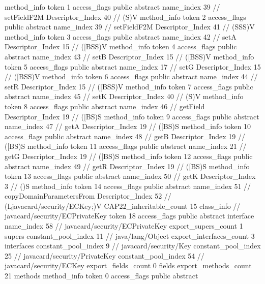 {{{{{				}
				method_info {
					token	1
					access_flags	public abstract
					name_index	39		// setFieldF2M
					Descriptor_Index	40		// (S)V
				}
				method_info {
					token	2
					access_flags	public abstract
					name_index	39		// setFieldF2M
					Descriptor_Index	41		// (SSS)V
				}
				method_info {
					token	3
					access_flags	public abstract
					name_index	42		// setA
					Descriptor_Index	15		// ([BSS)V
				}
				method_info {
					token	4
					access_flags	public abstract
					name_index	43		// setB
					Descriptor_Index	15		// ([BSS)V
				}
				method_info {
					token	5
					access_flags	public abstract
					name_index	17		// setG
					Descriptor_Index	15		// ([BSS)V
				}
				method_info {
					token	6
					access_flags	public abstract
					name_index	44		// setR
					Descriptor_Index	15		// ([BSS)V
				}
				method_info {
					token	7
					access_flags	public abstract
					name_index	45		// setK
					Descriptor_Index	40		// (S)V
				}
				method_info {
					token	8
					access_flags	public abstract
					name_index	46		// getField
					Descriptor_Index	19		// ([BS)S
				}
				method_info {
					token	9
					access_flags	public abstract
					name_index	47		// getA
					Descriptor_Index	19		// ([BS)S
				}
				method_info {
					token	10
					access_flags	public abstract
					name_index	48		// getB
					Descriptor_Index	19		// ([BS)S
				}
				method_info {
					token	11
					access_flags	public abstract
					name_index	21		// getG
					Descriptor_Index	19		// ([BS)S
				}
				method_info {
					token	12
					access_flags	public abstract
					name_index	49		// getR
					Descriptor_Index	19		// ([BS)S
				}
				method_info {
					token	13
					access_flags	public abstract
					name_index	50		// getK
					Descriptor_Index	3		// ()S
				}
				method_info {
					token	14
					access_flags	public abstract
					name_index	51		// copyDomainParametersFrom
					Descriptor_Index	52		// (Ljavacard/security/ECKey;)V
				}
			}
			CAP22_inheritable_count	15
		}
		class_info {		// javacard/security/ECPrivateKey
			token	18
			access_flags	public abstract interface
			name_index	58		// javacard/security/ECPrivateKey
			export_supers_count	1
			supers {
				constant_pool_index	11		// java/lang/Object
			}
			export_interfaces_count	3
			interfaces {
				constant_pool_index	9		// javacard/security/Key
				constant_pool_index	25		// javacard/security/PrivateKey
				constant_pool_index	54		// javacard/security/ECKey
			}
			export_fields_count	0
			fields {
			}
			export_methods_count	21
			methods {
				method_info {
					token	0
					access_flags	public abstract
}}}}}

